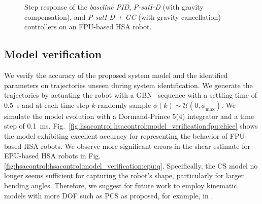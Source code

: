 \begin{figure}[ht]
    \centering
    \caption{Step response of the \emph{baseline PID}, \emph{P-satI-D} (with gravity compensation), and \emph{P-satI-D + GC} (with gravity cancellation) controllers on an FPU-based HSA robot.}\label{fig:hsacontrol:hsacontrol:experimental_results:fpu:step_response}
\end{figure}

\subsection{Model verification}\label{sub:hsacontrol:experiments:model_verification}
We verify the accuracy of the proposed system model and the identified parameters on trajectories unseen during system identification. We generate the trajectories by actuating the robot with a \gls{GBN}~\cite{tulleken1990generalized} sequence with a settling time of \SI{0.5}{s} and at each time step $k$ randomly sample $\phi(k) \sim \mathcal{U}(0, \phi_\mathrm{max})$.
We simulate the model evolution with a Dormand-Prince 5(4) integrator and a time step of \SI{0.1}{ms}.
Fig.~\ref{fig:hsacontrol:hsacontrol:model_verification:fpu:chiee} shows the model exhibiting excellent accuracy for representing the behavior of FPU-based \gls{HSA} robots.
We observe more significant errors in the shear estimate for EPU-based \gls{HSA} robots in Fig.\ref{fig:hsacontrol:hsacontrol:model_verification:epu:q}. Specifically, the \gls{CS} model no longer seems sufficient for capturing the robot's shape, particularly for larger bending angles. Therefore, we suggest for future work to employ kinematic models with more \gls{DOF} such as \gls{PCS} as proposed, for example, in \cite{stolzle2023modelling}.

